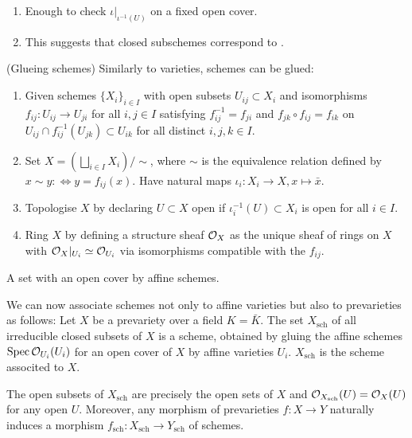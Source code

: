 \documentclass[a4paper,11pt]{article}
\begin{document}
			\begin{remark}
				\begin{enumerate}
					\item Enough to check $\iota|_{\iota^{-1}(U)}$ on a fixed open cover.
					\item This suggests that closed subschemes correspond to .
				\end{enumerate}
			\end{remark}

			\begin{remark}(Glueing schemes)
				Similarly to  varieties, schemes can be glued:
				\begin{enumerate}
					\item Given schemes $\{X_i\}_{i\in I}$ with open subsets $U_{ij}\subset X_i$ and isomorphisms $f_{ij}:U_{ij}\rightarrow U_{ji}$ for all $i,j\in I$ satisfying $f^{-1}_{ij}=f_{ji}$ and $f_{jk}\circ f_{ij}=f_{ik}$ on $U_{ij}\cap f^{-1}_{ij}(U_{jk})\subset U_{ik}$ for all distinct $i,j,k\in I$.
					\item Set $X=(\bigsqcup_{i\in I}X_i)/\sim$, where $\sim$ is the equivalence relation defined by $x\sim y:\Longleftrightarrow y=f_{ij}(x)$. Have natural maps $\iota_i:X_i\rightarrow X, x\mapsto\bar{x}$.
					\item Topologise $X$ by declaring $U\subset X$ open if $\iota^{-1}_i(U)\subset X_i$ is open for all $i\in I$.
					\item Ring $X$ by defining a structure sheaf $\mathcal{O}_X$ as the unique sheaf of rings on $X$ with $\mathcal{O}_X|_{U_i}\simeq\mathcal{O}_{U_i}$ via isomorphisms compatible with the $f_{ij}$.
				\end{enumerate}
			\end{remark}

			\begin{eg}
				A set with an open cover by affine schemes.
			\end{eg}

			We can now associate schemes not only to affine varieties but also to prevarieties as follows: Let $X$ be a prevariety over a field $K=\bar{K}$. The set $X_\mathrm{sch}$ of all irreducible closed subsets of $X$ is a scheme, obtained by gluing the affine schemes $\operatorname{Spec} \mathcal{O}_{U_i}(U_i)$ for an open cover of $X$ by affine varieties $U_i$. $X_\mathrm{sch}$ is the scheme associted to $X$.

			\begin{prop}
				The open subsets of $X_\mathrm{sch}$ are precisely the open sets of $X$ and $\mathcal{O}_{X_\mathrm{sch}}(U)=\mathcal{O}_X(U)$ for any open $U$. Moreover, any morphism of prevarieties $f:X\rightarrow Y$ naturally induces a morphism $f_\mathrm{sch}:X_\mathrm{sch}\rightarrow Y_\mathrm{sch}$ of schemes.
			\end{prop}
\end{document}
